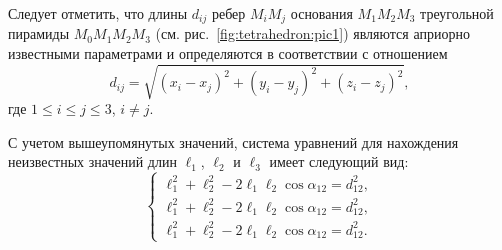 \documentclass[../main.tex]{subfiles}
\begin{document}
Следует отметить, что длины $d_{ij}$ ребер $M_i M_j$ основания $M_1 M_2 M_3$ треугольной пирамиды $M_0 M_1 M_2 M_3$ (см. рис.~\ref{fig:tetrahedron:pic1}) являются априорно известными параметрами и определяются в соответствии с отношением
\begin{equation*}
  d_{ij} = \sqrt{\left(x_i - x_j\right)^2 + \left(y_i - y _j\right)^2 + \left(z_i - z_j\right)^2},
\end{equation*}
где $1 \le i \le j \le 3$, $i \ne j$.

С учетом вышеупомянутых значений, система уравнений для нахождения неизвестных значений длин $\ell_1$, $\ell_2$ и $\ell_3$ имеет следующий вид:
\begin{equation} \label{eq:tetrahedron:system}
    \begin{cases}
    \ell_1^2 + \ell_2^2 - 2 \ell_1 \ell_2 \cos\alpha_{12} = d_{12}^2, \\
    \ell_1^2 + \ell_2^2 - 2 \ell_1 \ell_2 \cos\alpha_{12} = d_{12}^2, \\
    \ell_1^2 + \ell_2^2 - 2 \ell_1 \ell_2 \cos\alpha_{12} = d_{12}^2.
    \end{cases}
\end{equation}
\end{document}
